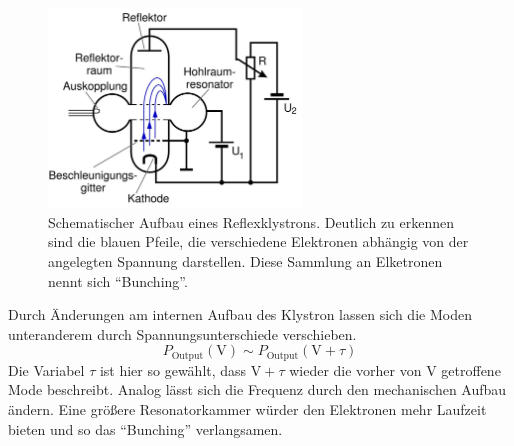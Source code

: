 \begin{figure}
    \centering
    \includegraphics[width=0.6\textwidth]{bilder/theo.JPG}
    \caption{Schematischer Aufbau eines Reflexklystrons. Deutlich zu erkennen sind die blauen Pfeile, die verschiedene Elektronen abhängig von der angelegten Spannung darstellen. 
    Diese Sammlung an Elketronen nennt sich \enquote{Bunching}.} 
    \label{fig:ref}
\end{figure}
Durch Änderungen am internen Aufbau des Klystron lassen sich die Moden unteranderem durch Spannungsunterschiede verschieben. 
\begin{equation}
    P_{\text{Output}} (\si{\volt}) \sim P_{\text{Output}} (\si{\volt} + \tau)
\end{equation}
Die Variabel $\tau$ ist hier so gewählt, dass $\si{\volt} + \tau$ wieder die vorher von $\si{\volt}$ getroffene Mode beschreibt.
Analog lässt sich die Frequenz durch den mechanischen Aufbau ändern. Eine größere Resonatorkammer würder den Elektronen 
mehr Laufzeit bieten und so das \enquote{Bunching} verlangsamen.


